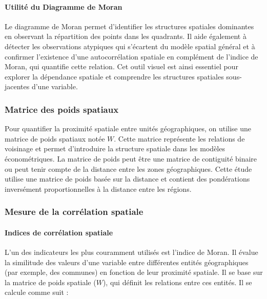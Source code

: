 \documentclass[
]{article}
\begin{document}
\hypertarget{utilituxe9-du-diagramme-de-moran}{%
\paragraph{Utilité du Diagramme de
Moran}\label{utilituxe9-du-diagramme-de-moran}}

Le diagramme de Moran permet d'identifier les structures spatiales
dominantes en observant la répartition des points dans les quadrants. Il
aide également à détecter les observations atypiques qui s'écartent du
modèle spatial général et à confirmer l'existence d'une autocorrélation
spatiale en complément de l'indice de Moran, qui quantifie cette
relation. Cet outil visuel est ainsi essentiel pour explorer la
dépendance spatiale et comprendre les structures spatiales sous-jacentes
d'une variable.

\hypertarget{matrice-des-poids-spatiaux}{%
\subsubsection{Matrice des poids
spatiaux}\label{matrice-des-poids-spatiaux}}

Pour quantifier la proximité spatiale entre unités géographiques, on
utilise une matrice de poids spatiaux notée \(W\). Cette matrice
représente les relations de voisinage et permet d'introduire la
structure spatiale dans les modèles économétriques. La matrice de poids
peut être une matrice de contiguité binaire ou peut tenir compte de la
distance entre les zones géographiques. Cette étude utilise une matrice
de poids basée sur la distance et contient des pondérations inversément
proportionnelles à la distance entre les régions.

\hypertarget{mesure-de-la-corruxe9lation-spatiale}{%
\subsubsection{Mesure de la corrélation
spatiale}\label{mesure-de-la-corruxe9lation-spatiale}}

\hypertarget{indices-de-corruxe9lation-spatiale}{%
\paragraph{Indices de corrélation
spatiale}\label{indices-de-corruxe9lation-spatiale}}

L'un des indicateurs les plus couramment utilisés est l'indice de Moran.
Il évalue la similitude des valeurs d'une variable entre différentes
entités géographiques (par exemple, des communes) en fonction de leur
proximité spatiale. Il se base sur la matrice de poids spatiale (\(W\)),
qui définit les relations entre ces entités. Il se calcule comme suit :
\end{document}
